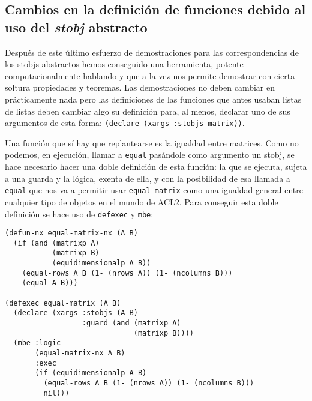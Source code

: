 \documentclass[a4paper,10pt]{article}
\begin{document}
\vspace{12pt}
\subsection{Cambios en la definición de funciones debido al uso del \emph{stobj} abstracto}
\vspace{10pt}

Después de este último esfuerzo de demostraciones para las correspondencias de los stobjs abstractos hemos conseguido una herramienta, potente computacionalmente hablando y que a la vez nos permite demostrar con cierta soltura propiedades y teoremas. Las demostraciones no deben cambiar en prácticamente nada pero las definiciones de las funciones que antes usaban listas de listas deben cambiar algo su definición para, al menos, declarar uno de sus argumentos de esta forma: \texttt{(declare (xargs :stobjs matrix))}.

\par \vspace{10pt}

Una función que sí hay que replantearse es la igualdad entre matrices. Como no podemos, en ejecución, llamar a \texttt{equal} pasándole como argumento un stobj, se hace necesario hacer una doble definición de esta función: la que se ejecuta, sujeta a una guarda y la lógica, exenta de ella, y con la posibilidad de esa llamada a \texttt{equal} que nos va a permitir usar \texttt{equal-matrix} como una igualdad general entre cualquier tipo de objetos en el mundo de ACL2. Para conseguir esta doble definición se hace uso de \texttt{defexec} y \texttt{mbe}:

\par \vspace{10pt}

\begin{lstlisting}[language=clips]
(defun-nx equal-matrix-nx (A B)
  (if (and (matrixp A)
           (matrixp B)
           (equidimensionalp A B))
    (equal-rows A B (1- (nrows A)) (1- (ncolumns B)))
    (equal A B)))

(defexec equal-matrix (A B)
  (declare (xargs :stobjs (A B)
                  :guard (and (matrixp A)
                              (matrixp B))))
  (mbe :logic
       (equal-matrix-nx A B)
       :exec
       (if (equidimensionalp A B)
         (equal-rows A B (1- (nrows A)) (1- (ncolumns B)))
         nil)))
\end{lstlisting}

\par \vspace{10pt}
\end{document}
